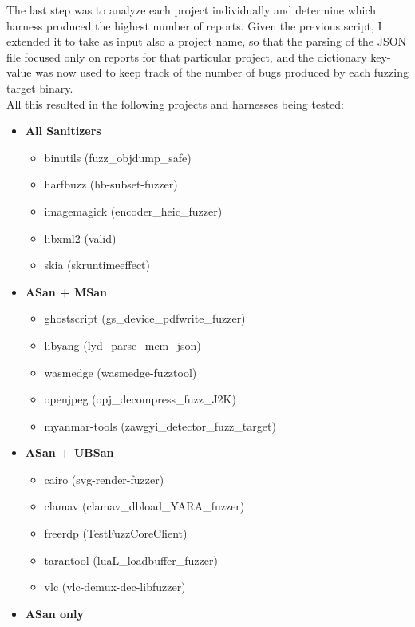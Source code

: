 \newpage
The last step was to analyze each project individually and determine which harness produced the highest number of reports.
\newline
Given the previous script, I extended it to take as input also a project name, so that the parsing of the JSON file focused only on reports for that particular project, and the dictionary key-value was now used to keep track of the number of bugs produced by each fuzzing target binary.
\ \\ \newline \newline
All this resulted in the following projects and harnesses being tested:
\begin{itemize}
  \item \textbf{All Sanitizers}
  \begin{itemize}
    \item binutils (fuzz\_objdump\_safe)
    \item harfbuzz (hb-subset-fuzzer)
    \item imagemagick (encoder\_heic\_fuzzer)
    \item libxml2 (valid)
    \item skia (skruntimeeffect)
  \end{itemize}
  \item \textbf{ASan + MSan}
  \begin{itemize}
    \item ghostscript (gs\_device\_pdfwrite\_fuzzer)
    \item libyang (lyd\_parse\_mem\_json)
    \item wasmedge (wasmedge-fuzztool)
    \item openjpeg (opj\_decompress\_fuzz\_J2K)
    \item myanmar-tools (zawgyi\_detector\_fuzz\_target)
  \end{itemize}
  \item \textbf{ASan + UBSan}
  \begin{itemize}
    \item cairo (svg-render-fuzzer)
    \item clamav (clamav\_dbload\_YARA\_fuzzer)
    \item freerdp (TestFuzzCoreClient)
    \item tarantool (luaL\_loadbuffer\_fuzzer)
    \item vlc (vlc-demux-dec-libfuzzer)
  \end{itemize}
  \item \textbf{ASan only}
  \begin{itemize}

\end{itemize}
\end{itemize}
